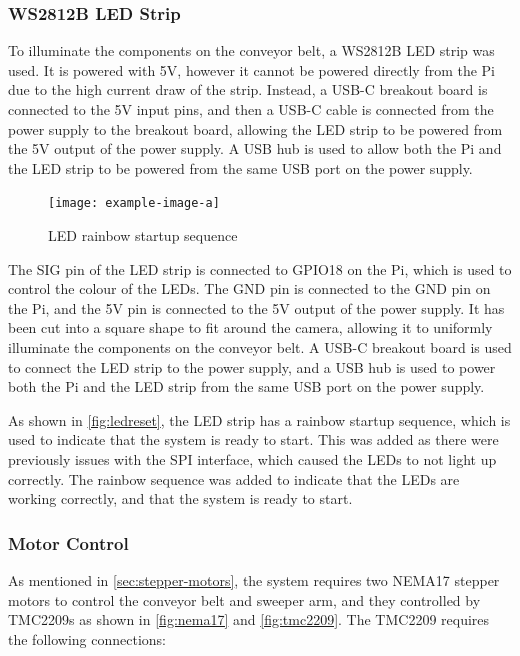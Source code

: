 \subsubsection{WS2812B LED Strip}
\label{sec:ws2812b-led-strip}
To illuminate the components on the conveyor belt, a WS2812B LED strip was used. It is powered with 5V, however it cannot be powered directly from the Pi due to the high current draw of the strip. Instead, a USB-C breakout board is connected to the 5V input pins, and then a USB-C cable is connected from the power supply to the breakout board, allowing the LED strip to be powered from the 5V output of the power supply. A USB hub is used to allow both the Pi and the LED strip to be powered from the same USB port on the power supply.

\begin{figure}[H]
  \hfill
  \begin{minipage}[t]{\textwidth}
    \centering
    \texttt{[image: example-image-a]}
    \caption{LED rainbow startup sequence}
    \label{fig:ledreset}
  \end{minipage}
\end{figure}

The SIG pin of the LED strip is connected to GPIO18 on the Pi, which is used to control the colour of the LEDs. The GND pin is connected to the GND pin on the Pi, and the 5V pin is connected to the 5V output of the power supply. It has been cut into a square shape to fit around the camera, allowing it to uniformly illuminate the components on the conveyor belt. A USB-C breakout board is used to connect the LED strip to the power supply, and a USB hub is used to power both the Pi and the LED strip from the same USB port on the power supply.

As shown in \autoref{fig:ledreset}, the LED strip has a rainbow startup sequence, which is used to indicate that the system is ready to start. This was added as there were previously issues with the SPI interface, which caused the LEDs to not light up correctly. The rainbow sequence was added to indicate that the LEDs are working correctly, and that the system is ready to start.

\subsubsection{Motor Control}
As mentioned in \autoref{sec:stepper-motors}, the system requires two NEMA17 stepper motors 
to control the conveyor belt and sweeper arm, and they controlled by TMC2209s as shown in \autoref{fig:nema17} and \autoref{fig:tmc2209}. The TMC2209 requires the following connections:

